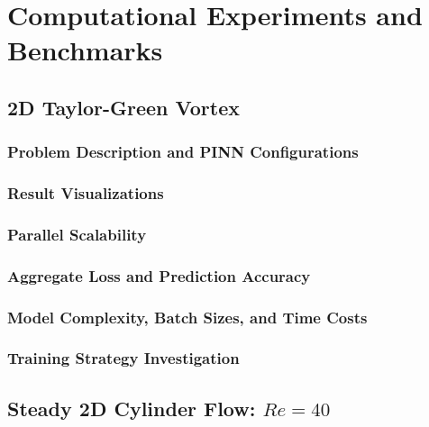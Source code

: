 \chapter{Computational Experiments and Benchmarks}\label{chap:pinn-cases}

\section{2D Taylor-Green Vortex}\label{sec:pinn-2d-tgv}

    \subsection{Problem Description and PINN Configurations}
    \label{sec:pinn-2d-tgv-intro}
    

    \subsection{Result Visualizations}
    \label{sec:pinn-2d-tgv-vis}
    

    \subsection{Parallel Scalability}
    \label{sec:pinn-2d-tgv-scaling}
    

    \subsection{Aggregate Loss and Prediction Accuracy}
    \label{sec:pinn-2d-tgv-loss-vs-accuracy}
    

    \subsection{Model Complexity, Batch Sizes, and Time Costs}
    \label{sec:pinn-2d-tgv-model-complexity}
    

    \subsection{Training Strategy Investigation}
    \label{sec:pinn-2d-tgv-training-strategy}
    

\section{Steady 2D Cylinder Flow: \texorpdfstring{$Re=40$}{re40}}
\label{sec:pinn-2d-cylinder-re40}


